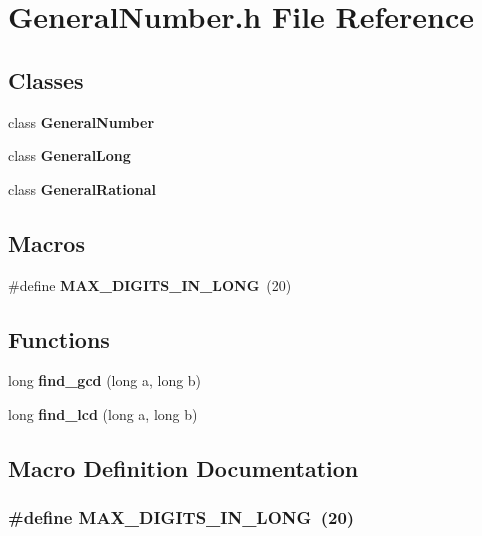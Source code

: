 \section{General\+Number.\+h File Reference}
\label{GeneralNumber_8h}
\subsection*{Classes}
\begin{DoxyCompactItemize}
\item 
class {\bf General\+Number}
\item 
class {\bf General\+Long}
\item 
class {\bf General\+Rational}
\end{DoxyCompactItemize}
\subsection*{Macros}
\begin{DoxyCompactItemize}
\item 
\#define {\bf M\+A\+X\+\_\+\+D\+I\+G\+I\+T\+S\+\_\+\+I\+N\+\_\+\+L\+O\+NG}~(20)
\end{DoxyCompactItemize}
\subsection*{Functions}
\begin{DoxyCompactItemize}
\item 
long {\bf find\+\_\+gcd} (long a, long b)
\item 
long {\bf find\+\_\+lcd} (long a, long b)
\end{DoxyCompactItemize}


\subsection{Macro Definition Documentation}
\subsubsection[{M\+A\+X\+\_\+\+D\+I\+G\+I\+T\+S\+\_\+\+I\+N\+\_\+\+L\+O\+NG}]{\setlength{\rightskip}{0pt plus 5cm}\#define M\+A\+X\+\_\+\+D\+I\+G\+I\+T\+S\+\_\+\+I\+N\+\_\+\+L\+O\+NG~(20)}\label{GeneralNumber_8h_a4536bcf3e78506090145549baf064f59}


